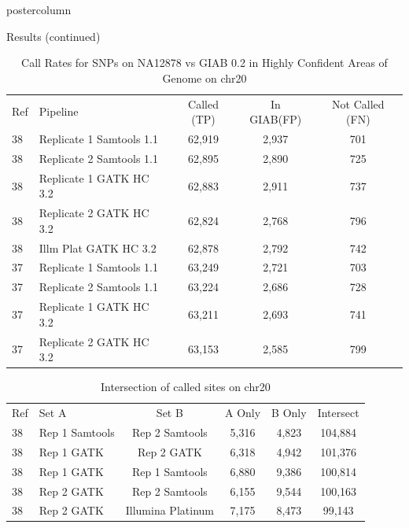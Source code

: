 \documentclass[final,xcolor=table]{beamer}
\begin{document}
\begin{frame}{}
\begin{columns}
\begin{column}{.49\textwidth}
\begin{beamercolorbox}[center,wd=\textwidth]{postercolumn}
\begin{minipage}[T]{.95\textwidth}
            \begin{block}{Results (continued)}
            \begin{table}[h]

\begin{tabular}{|l|l|c|c|c|}
\hline
\rowcolor{sangerlightblue3}
Ref & Pipeline & Called (TP) & In GIAB(FP) & Not Called (FN) \\ \cline{1-5}
38 & Replicate 1 Samtools 1.1 & 62,919 & 2,937 & 701 \\
38 & Replicate 2 Samtools 1.1 & 62,895 & 2,890 & 725 \\
38 & Replicate 1 GATK HC 3.2 & 62,883 & 2,911 & 737 \\
38 & Replicate 2 GATK HC 3.2 & 62,824 & 2,768 & 796 \\
38 & Illm Plat GATK HC 3.2 & 62,878 & 2,792 & 742 \\
37 & Replicate 1 Samtools 1.1 & 63,249 & 2,721 & 703 \\
37 & Replicate 2 Samtools 1.1 & 63,224 & 2,686 & 728 \\
37 & Replicate 1 GATK HC 3.2 & 63,211 & 2,693 & 741 \\
37 & Replicate 2 GATK HC 3.2 & 63,153 & 2,585 & 799 \\ \cline{1-5}
\hline
\end{tabular}
\caption{Call Rates for SNPs on NA12878 vs GIAB 0.2 in Highly Confident Areas of Genome on chr20}
\label{table:2}
\end{table}

            \begin{table}[h]

\begin{tabular}{|l|l|c|c|c|c|}
\hline
\rowcolor{sangerlightblue3}
Ref & Set A & Set B & A Only & B Only & Intersect \\ \cline{1-6}
38 & Rep 1 Samtools & Rep 2 Samtools & 5,316 & 4,823 & 104,884 \\
38 & Rep 1 GATK & Rep 2 GATK & 6,318 & 4,942 & 101,376 \\
38 & Rep 1 GATK & Rep 1 Samtools&6,880 & 9,386 &100,814 \\
38 & Rep 2 GATK & Rep 2 Samtools&6,155 & 9,544 &100,163 \\
38 & Rep 2 GATK & Illumina Platinum&7,175 & 8,473 & 99,143 \\ \cline{1-6}
\end{tabular}
\caption{Intersection of called sites on chr20}
\end{table}


\end{block}
\end{minipage}
\end{beamercolorbox}
\end{column}
\end{columns}
\end{frame}
\end{document}
